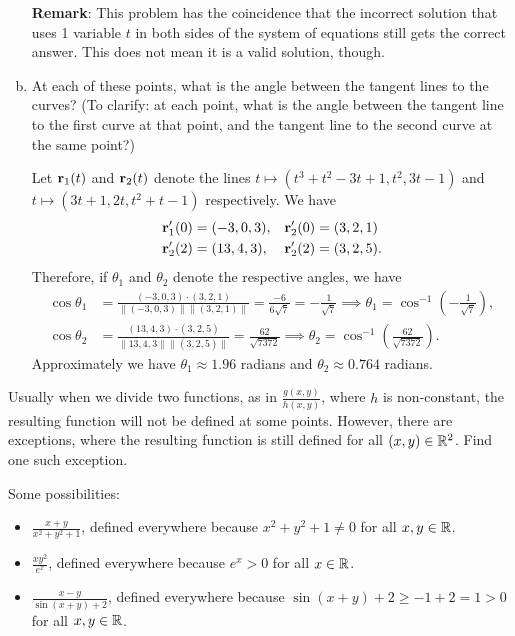 \begin{problem}
\begin{enumerate}[(a)]
\begin{solution}
      \textbf{Remark}: This problem has the coincidence that the incorrect solution that uses 1 variable $t$ in both sides of the system of equations still gets the correct answer. This does not mean it is a valid solution, though.
    \end{solution}
    \item At each of these points, what is the angle between the tangent lines to the curves? (To clarify: at each point, what is the angle between the tangent line to the first curve at that point, and the tangent line to the second curve at the same point?)
    \begin{solution}
      Let $\mathbf r_1(t)$ and $\mathbf r_2(t)$ denote the lines $t\mapsto (t^3+t^2-3t+1,t^2,3t-1)$ and $t\mapsto(3t+1,2t,t^2+t-1)$ respectively. We have
      \begin{align*}
        \mathbf r_1'(0) &= (-3,0,3),& \mathbf r_2'(0) &= (3,2,1)\\
        \mathbf r_2'(2) &= (13,4,3),& \mathbf r_2'(2) &= (3,2,5).
      \end{align*}
      Therefore, if $\theta_1$ and $\theta_2$ denote the respective angles, we have
      \begin{align*}
        \cos\theta_1 &= \frac{(-3,0,3)\cdot(3,2,1)}{\|(-3,0,3)\|\|(3,2,1)\|}=\frac{-6}{6\sqrt7}=-\frac1{\sqrt7}\implies \theta_1=\cos^{-1}\left(-\frac1{\sqrt7}\right),\\
        \cos\theta_2 &= \frac{(13,4,3)\cdot(3,2,5)}{\|13,4,3\|\|(3,2,5)\|}=\frac{62}{\sqrt{7372}}\implies \theta_2=\cos^{-1}\left(\frac{62}{\sqrt{7372}}\right).
      \end{align*}
      Approximately we have $\theta_1\approx 1.96$ radians and $\theta_2\approx 0.764$ radians.
    \end{solution}
  \end{enumerate}
\end{problem}

\begin{problem}
  Usually when we divide two functions, as in $\frac{g(x,y)}{h(x,y)}$, where $h$ is non-constant, the resulting function will not be defined at some points. However, there are exceptions, where the resulting function is still defined for all $(x,y)\in\mathbb R^2$. Find one such exception.
\end{problem}
\begin{solution}
  Some possibilities:
  \begin{itemize}
    \item $\frac{x+y}{x^2+y^2+1}$, defined everywhere because $x^2+y^2+1\neq 0$ for all $x,y\in\mathbb R$.
    \item $\frac{xy^2}{e^x}$, defined everywhere because $e^x>0$ for all $x\in\mathbb R$.
    \item $\frac{x-y}{\sin(x+y)+2}$, defined everywhere because $\sin(x+y)+2\geq -1+2=1>0$ for all $x,y\in\mathbb R$.
  \end{itemize}
\end{solution}

